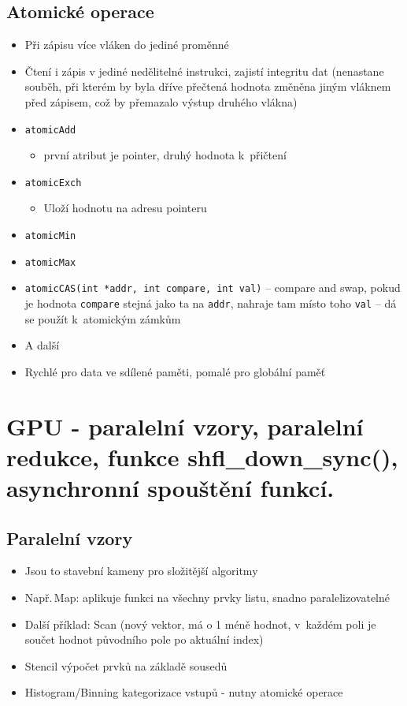 \subsection{Atomické operace}
\begin{itemize}
    \item Při zápisu více vláken do jediné proměnné
    \item Čtení i zápis v jediné nedělitelné instrukci, zajistí integritu dat (nenastane souběh, při kterém by byla dříve přečtená hodnota změněna jiným vláknem před zápisem, což by přemazalo výstup druhého vlákna)
    \item \texttt{atomicAdd}
    \begin{itemize}
        \item první atribut je pointer, druhý hodnota k~přičtení
    \end{itemize}
    \item \texttt{atomicExch}
    \begin{itemize}
        \item Uloží hodnotu na adresu pointeru
    \end{itemize}
    \item \texttt{atomicMin}
    \item \texttt{atomicMax}
    \item \texttt{atomicCAS(int *addr, int compare, int val)} -- compare and swap, pokud je hodnota \texttt{compare} stejná jako ta na \texttt{addr}, nahraje tam místo toho \texttt{val} -- dá se použít k~atomickým zámkům
    \item A další
    \item Rychlé pro data ve sdílené paměti, pomalé pro globální paměť
\end{itemize}

\section{GPU - paralelní vzory, paralelní redukce, funkce shfl\_down\_sync(), asynchronní spouštění funkcí.}

\subsection{Paralelní vzory}
\begin{itemize}
    \item Jsou to stavební kameny pro složitější algoritmy
    \item Např.\,Map: aplikuje funkci na všechny prvky listu, snadno paralelizovatelné
    \item Další příklad: Scan (nový vektor, má o 1 méně hodnot, v~každém poli je součet hodnot původního pole po aktuální index)
    \item Stencil výpočet prvků na základě sousedů
    \item Histogram/Binning kategorizace vstupů - nutny atomické operace
\end{itemize}
